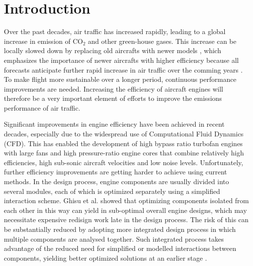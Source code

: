 \chapter{Introduction \label{ch:Intro}}
Over the past decades, air traffic has increased rapidly, leading to a global increase in emission of CO$_2$ and other green-house gases. This increase can be locally slowed down by replacing old aircrafts with newer models \cite{emission}, which emphasizes the importance of newer aircrafts with higher efficiency because all forecasts anticipate further rapid increase in air traffic over the comming years \cite{airbus,jadc}. To make flight more sustainable over a longer period, continuous performance improvements are needed. Increasing the efficiency of aircraft engines will therefore be a very important element of efforts to improve the emissions performance of air traffic.

Significant improvements in engine efficiency have been achieved in recent decades, especially due to the widespread use of Computational Fluid Dynamics (CFD). This has enabled the development of high bypass ratio turbofan engines with large fans and high pressure-ratio engine cores that combine relatively high efficiencies, high sub-sonic aircraft velocities and low noise levels. Unfortunately, further efficiency improvements are getting harder to achieve using current methods. In the design process, engine components are usually divided into several modules, each of which is optimized separately using a simplified interaction scheme. Ghisu et al. \cite{IntegrP2} showed that optimizing components isolated from each other in this way can yield in sub-optimal overall engine designs, which may necessitate expensive redisign work late in the design process. The risk of this can be substantially reduced by adopting more integrated design process in which multiple components are analysed together. Such integrated process takes advantage of the reduced need for simplified or modelled interactions between components, yielding better optimized solutions at an earlier stage \cite{IntegrP1,IntegrP2}.

